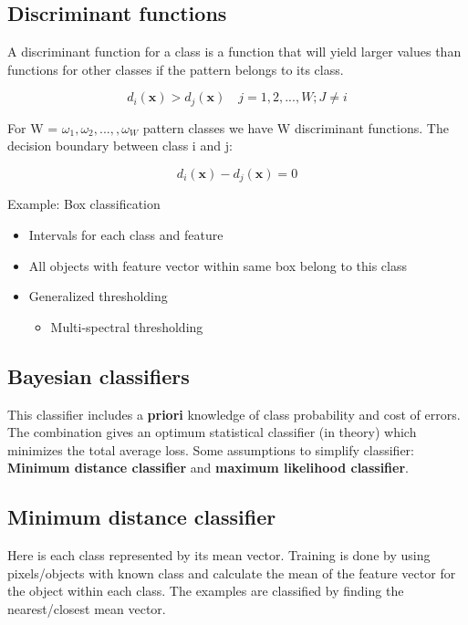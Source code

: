 \subsection*{Discriminant functions}
A discriminant function for a class is a function that will yield larger values than functions for other classes if the pattern belongs to its class. 

\begin{equation}
d_i(\textbf{x}) > d_j(\textbf{x}) \quad j=1,2,...,W; J\neq i
\end{equation}

For W = $\omega_1, \omega_2, ..., ,\omega_W$ pattern classes we have W discriminant functions. The decision boundary between class i and j: 

\begin{equation}
d_i(\textbf{x}) - d_j(\textbf{x}) = 0
\end{equation}


\begin{example}{Example: Box classification}
\begin{itemize}
	\item Intervals for each class and feature
	\item All objects with feature vector within same box belong to this class
	\item Generalized thresholding
	\begin{itemize}
		\item Multi-spectral thresholding
	\end{itemize}
\end{itemize}
\end{example}	



\subsection*{Bayesian classifiers}
This classifier includes a \textbf{priori} knowledge of class probability and cost of errors. The combination gives an optimum statistical classifier (in theory) which minimizes the total average loss. Some assumptions to simplify classifier: \textbf{Minimum distance classifier} and \textbf{maximum likelihood classifier}.




\subsection*{Minimum distance classifier}
Here is each class represented by its mean vector. Training is done by using pixels/objects with known class and calculate the mean of the feature vector for the object within each class. The examples are classified by finding the nearest/closest mean vector. 

